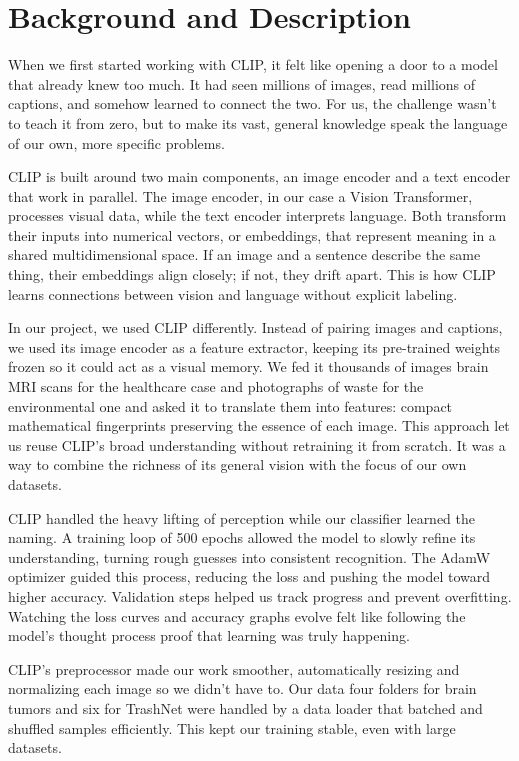 \documentclass[12pt]{article}
\begin{document}
\section{Background and Description}

When we first started working with CLIP, it felt like opening a door to a model that already knew too much. It had seen millions of images, read millions of captions, and somehow learned to connect the two. For us, the challenge wasn’t to teach it from zero, but to make its vast, general knowledge speak the language of our own, more specific problems.

CLIP is built around two main components, an image encoder and a text encoder that work in parallel. The image encoder, in our case a Vision Transformer, processes visual data, while the text encoder interprets language. Both transform their inputs into numerical vectors, or embeddings, that represent meaning in a shared multidimensional space. If an image and a sentence describe the same thing, their embeddings align closely; if not, they drift apart. This is how CLIP learns connections between vision and language without explicit labeling.

In our project, we used CLIP differently. Instead of pairing images and captions, we used its image encoder as a feature extractor, keeping its pre-trained weights frozen so it could act as a visual memory. We fed it thousands of images brain MRI scans for the healthcare case and photographs of waste for the environmental one and asked it to translate them into features: compact mathematical fingerprints preserving the essence of each image.
This approach let us reuse CLIP’s broad understanding without retraining it from scratch. It was a way to combine the richness of its general vision with the focus of our own datasets.

CLIP handled the heavy lifting of perception while our classifier learned the naming. A training loop of 500 epochs allowed the model to slowly refine its understanding, turning rough guesses into consistent recognition. The AdamW optimizer guided this process, reducing the loss and pushing the model toward higher accuracy. Validation steps helped us track progress and prevent overfitting. Watching the loss curves and accuracy graphs evolve felt like following the model’s thought process proof that learning was truly happening.

CLIP’s preprocessor made our work smoother, automatically resizing and normalizing each image so we didn’t have to. Our data four folders for brain tumors and six for TrashNet were handled by a data loader that batched and shuffled samples efficiently. This kept our training stable, even with large datasets.
\end{document}
